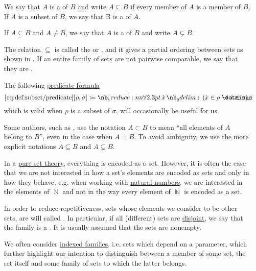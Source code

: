 \begin{definition}\label{def:subset}
  We say that \( A \) is a  of \( B \) and write \( A \subseteq B \) if every member of \( A \) is a member of \( B \). If \( A \) is a subset of \( B \), we say that B is a  of \( A \).

  If \( A \subseteq B \) and \( A \neq B \), we say that \( A \) is a  of \( B \) and write \( A \subsetneq B \).

  The relation \( \subseteq \) is called the  or , and it gives a partial ordering between sets as shown in . If an entire family of sets are not pairwise comparable, we say that they are .

  The following \hyperref[con:predicate_formula]{predicate formula}
  \begin{equation*}\taglabel[\op{IsSubset}]{eq:def:subset/predicate}
    \ref{eq:def:subset/predicate}[\rho, \sigma] \coloneqq \qforall \synx (\synx \in \rho \synimplies \synx \in \sigma),
  \end{equation*}
  which is valid when \( \rho \) is a subset of \( \sigma \), will occasionally be useful for us.
\end{definition}
\begin{comments}
  \item Some authors, such as \cite{Kelley1975Topology}, use the notation \( A \subset B \) to mean \enquote{all elements of \( A \) belong to \( B \)}, even in the case when \( A = B \). To avoid ambiguity, we use the more explicit notations \( A \subseteq B \) and \( A \subsetneq B \).
\end{comments}

\begin{remark}\label{rem:family_of_sets}
  In a \hyperref[rem:pure_set_theory]{pure set theory}, everything is encoded as a set. However, it is often the case that we are not interested in how a set's elements are encoded as sets and only in how they behave, e.g. when working with \hyperref[def:natural_numbers]{natural numbers}, we are interested in the elements of \( \BbbN \) and not in the way every element of \( \BbbN \) is encoded as a set.

  In order to reduce repetitiveness, sets whose elements we consider to be other sets, are will called . In particular, if all (different) sets are \hyperref[def:subset]{disjoint}, we say that the family is a . It is usually assumed that the sets are nonempty.

  We often consider \hyperref[def:cartesian_product/indexed_family]{indexed families}, i.e. sets which depend on a parameter, which further highlight our intention to distinguish between a member of some set, the set itself and some family of sets to which the latter belongs.
\end{remark}

